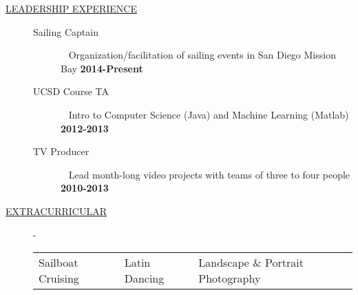 \documentclass[12pt]{article}
\begin{document}
\begin{description}
        \fi

        \item[\underline{LEADERSHIP EXPERIENCE}] \hfill
            \begin{description}
                \item[Sailing Captain] \textbullet ~ Organization/facilitation of sailing events in San Diego Mission Bay \hfill \textbf{2014-Present}
                \item[UCSD Course TA]
                    \textbullet ~ Intro to Computer Science (Java) and Machine Learning (Matlab)    \hfill \textbf{2012-2013}
                \item[TV Producer] \textbullet ~ Lead month-long video projects with teams of three to four people \hfill \textbf{2010-2013}
            \end{description}

        \item[\underline{EXTRACURRICULAR}] -
            \begin{tabular}{l|l|l}
                Sailboat Cruising & Latin Dancing & Landscape \& Portrait Photography
            \end{tabular}

    \end{description}
\end{document}
